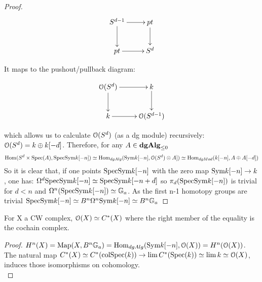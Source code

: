 \begin{refsection}
\begin{proof}
\begin{displaymath}
\xymatrix{
S^{d-1} \ar[r] \ar[d] &  pt \ar[d]\\
 pt \ar[r] & S^d\\
}
\end{displaymath}

It maps to the pushout/pullback diagram:

\begin{displaymath}
\xymatrix{
\O(S^{d}) \ar[r] \ar[d] &  k \ar[d]\\
 k \ar[r] & \O(S^{d-1})\\
}
\end{displaymath}

which allows us to calculate $\mathcal{O}(S^d)$ (as a dg module) recursively: $\mathcal{O}(S^d)=k\oplus k[-d]$. Therefore, for any $A \in\mathbf{dgAlg}_{\leq 0}$
$$\mathrm{Hom}(S^d\times \mathrm{Spec}(A),\mathrm{Spec} \text{Sym} k[-n])\simeq \mathrm{Hom}_{dgAlg}(\text{Sym} k[-n],\mathcal{O}(S^d)\otimes A])\simeq \mathrm{Hom}_{dgMod}(k[-n],A\oplus A[-d])$$
So it is clear that, if one points $\mathrm{Spec}\text{Sym} k[-n]$ with the zero map $\text{Sym} k[-n]\to k$, one has:
$\Omega^d \mathrm{Spec} \text{Sym} k[-n]\simeq \mathrm{Spec}\text{Sym} k[-n+d]$ so $\pi_d(\mathrm{Spec} \text{Sym} k[-n])$ is trivial for $d<n$ and $\Omega^n(\mathrm{Spec} \text{Sym} k[-n])\simeq \mathbb{G}_a$.
As the first n-1 homotopy groups are trivial $\mathrm{Spec} \text{Sym} k[-n]\simeq B^n\Omega ^n\text{Sym} k[-n]\simeq B^n\mathbb{G}_a$
\end{proof}


\begin{theorem}
For X a CW complex, $\mathcal{O}(X)\simeq C^*(X)$ where the right member of the equality is the cochain complex.
\end{theorem}

\begin{proof}
$H^n(X)=\operatorname{\mathrm{Map}}(X,B^n\mathbb{G}_a)=\mathrm{Hom}_{dgAlg}(\text{Sym} k[-n],\mathcal{O}(X))=H^n(\mathcal{O}(X))$. The natural map $C^*(X)\simeq C^*(\text{col}\mathrm{Spec}(k))\to \lim C^*(\mathrm{Spec}(k))\simeq \lim k\simeq \mathcal{O}(X)$,
induces those isomorphisms on cohomology.\\
\end{proof}


\end{refsection}
